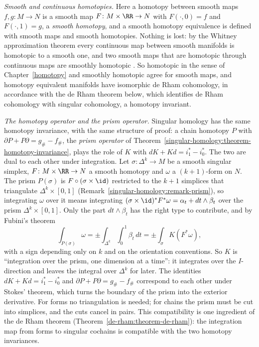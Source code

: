 \begin{remark}\label{de-rham:remark-smooth-homotopy}
\emph{Smooth and continuous homotopies.} Here a homotopy between smooth maps $f, g \colon M \to N$ is a smooth map $F \colon M \times \RR \to N$ with $F(\cdot, 0) = f$ and $F(\cdot, 1) = g$, a \emph{smooth
homotopy}, and a smooth homotopy equivalence is defined with smooth maps and smooth homotopies. Nothing is lost: by the Whitney approximation theorem every continuous map between smooth manifolds is
homotopic to a smooth one, and two smooth maps that are homotopic through continuous maps are smoothly homotopic \cite[Chapter 6]{lee-smooth-manifolds}. So homotopic in the sense of
Chapter~\ref{homotopy} and smoothly homotopic agree for smooth maps, and homotopy equivalent manifolds have isomorphic de Rham cohomology, in accordance with the de Rham theorem below, which identifies
de Rham cohomology with singular cohomology, a homotopy invariant.
\end{remark}

\begin{remark}\label{de-rham:remark-k-and-prism}
\emph{The homotopy operator and the prism operator.} Singular homology has the same homotopy invariance, with the same structure of proof: a chain homotopy $P$ with $\partial P + P\partial = g_\# - f_\#$, the
\emph{prism operator} of Theorem~\ref{singular-homology:theorem-homotopy-invariance}, plays the role of $K$ with $dK + Kd = i_1^* - i_0^*$. The two are dual to each other under integration. Let $\sigma \colon \Delta^k \to M$ be a
smooth singular simplex, $F \colon M \times \RR \to N$ a smooth homotopy and $\omega$ a $(k+1)$-form on $N$. The prism $P(\sigma)$ is $F \circ (\sigma \times \id)$ restricted to the $k + 1$ simplices that triangulate
$\Delta^k \times [0, 1]$ (Remark~\ref{singular-homology:remark-prism}), so integrating $\omega$ over it means integrating $(\sigma \times \id)^*F^*\omega = \alpha_t + dt \wedge \beta_t$ over the prism
$\Delta^k \times [0, 1]$. Only the part $dt \wedge \beta_t$ has the right type to contribute, and by Fubini's theorem
\[
\int_{P(\sigma)}\omega = \pm\int_{\Delta^k}\int_0^1\beta_t\,dt = \pm\int_\sigma K(F^*\omega),
\]
with a sign depending only on $k$ and on the orientation conventions. So $K$ is ``integration over the prism, one dimension at a time'': it integrates over the $I$-direction and leaves the integral over
$\Delta^k$ for later. The identities $dK + Kd = i_1^* - i_0^*$ and $\partial P + P\partial = g_\# - f_\#$ correspond to each other under Stokes' theorem, which turns the boundary of the prism into the exterior derivative.
For forms no triangulation is needed; for chains the prism must be cut into simplices, and the cuts cancel in pairs. This compatibility is one ingredient of the de Rham theorem
(Theorem~\ref{de-rham:theorem-de-rham}): the integration map from forms to singular cochains is compatible with the two homotopy invariances.
\end{remark}

